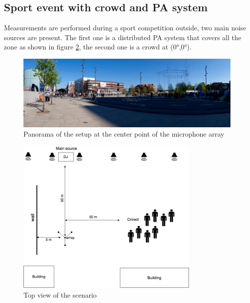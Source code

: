 \newpage
\subsection{Sport event with crowd and PA system }

Measurements are performed during a sport competition outside, two main noise sources are present. The first one is a distributed PA system that covers all the zone as shown in figure \ref{fig:Scenario1diagram}, the second one is a crowd at (0°,0°).

\begin{figure}[H]
    \centering
    \includegraphics[width=1\textwidth]{Figures/bmxracepic.jpg}
    \caption{Panorama of the setup at the center point of the microphone array}
    \label{fig:Scenario3}
\end{figure}

\begin{figure}[H]
    \centering
    \includegraphics[width=0.8\textwidth]{Figures/bmxrace1.png}
    \caption{Top view of the scenario}
    \label{fig:Scenario1diagram}
\end{figure}

